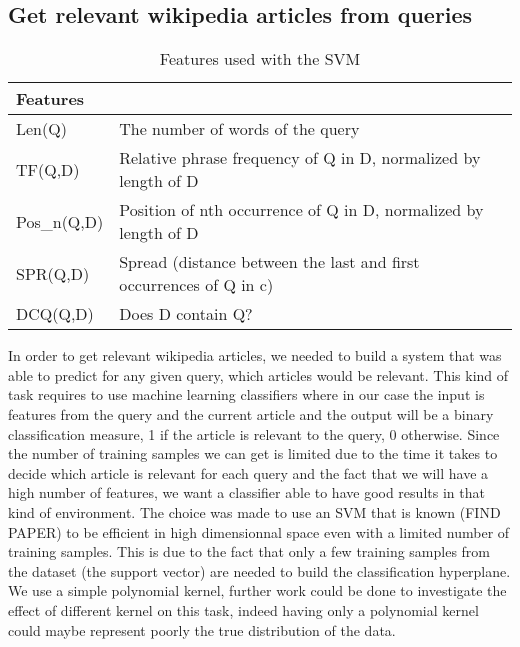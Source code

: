 \documentclass[sigconf]{acmart}
\begin{document}
\subsection{Get relevant wikipedia articles from queries}

\begin{table*}[!ht]
\centering
\captionsetup{labelformat=empty}
\caption{Features used with the SVM}
\label{TableFeat}
\begin{tabular}{ll} 
\hline
\multicolumn{2}{l}{Features}                                                      \\ 
\hline
Len(Q)      & The number of words of the query                                    \\
TF(Q,D)     & Relative phrase frequency of Q in D, normalized by length of D      \\
Pos\_n(Q,D) & Position of nth occurrence of Q in D, normalized by length of D     \\
SPR(Q,D)    & Spread (distance between the last and first occurrences of Q in c)  \\
DCQ(Q,D)    & Does D contain Q?                                                   \\
\hline
\end{tabular}
\end{table*}

In order to get relevant wikipedia articles, we needed to build a system that was able to predict for any given query, which articles would be relevant. This kind of task requires to use machine learning classifiers where in our case the input is features from the query and the current article and the output will be a binary classification measure, 1 if the article is relevant to the query, 0 otherwise. Since the number of training samples we can get is limited due to the time it takes to decide which article is relevant for each query and the fact that we will have a high number of features, we want a classifier able to have good results in that kind of environment. The choice was made to use an SVM that is known (FIND PAPER) to be efficient in high dimensionnal space even with a limited number of training samples. This is due to the fact that only a few training samples from the dataset (the support vector) are needed to build the classification hyperplane. We use a simple polynomial kernel, further work could be done to investigate the effect of different kernel on this task, indeed having only a polynomial kernel could maybe represent poorly the true distribution of the data.\\
\end{document}
